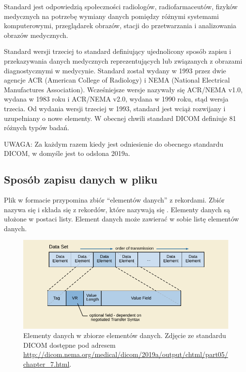 \label{sec:dicom}

\par
Standard \DICOM jest odpowiedzią społeczności radiologów, radiofarmaceutów, fizyków medycznych na potrzebę wymiany danych pomiędzy różnymi systemami komputerowymi, przeglądarek obrazów,  stacji do przetwarzania i analizowania obrazów medycznych.

\par
Standard \DICOM wersji trzeciej to standard definiujący ujednolicony sposób zapisu i przekazywania danych medycznych reprezentujących lub związanych z obrazami diagnostycznymi w medycynie.
Standard został wydany w 1993 przez dwie agencje ACR (American College of Radiology) i NEMA (National Electrical Manufactures Association).
Wcześniejsze wersje nazywały się ACR/NEMA v1.0, wydana w 1983 roku i ACR/NEMA v2.0, wydana w 1990 roku, stąd wersja trzecia.
Od wydania wersji trzeciej w 1993, standard jest wciąż rozwijany i uzupełniany o nowe elementy.
W obecnej chwili standard DICOM definiuje 81 różnych typów badań.

UWAGA: Za każdym razem kiedy jest odniesienie do obecnego standardu DICOM, w domyśle jest to odsłona 2019a.

\subsection{Sposób zapisu danych w pliku \DICOM}

\par
Plik w formacie \DICOM przypomina zbiór \enquote{elementów danych} z rekordami.
Zbiór nazywa się  i składa się z rekordów, które nazywają się .
Elementy danych są ułożone w postaci listy.
Element danych może zawierać w sobie listę elementów danych.

\begin{figure}[!htbp]
    \centering
    \includegraphics[]{img/dicom-dataelement001.pdf}
    \caption{Elementy danych w zbiorze elementów danych. Zdjęcie ze standardu DICOM dostępne pod adresem \url{http://dicom.nema.org/medical/dicom/2019a/output/chtml/part05/chapter_7.html}.}
    \label{fig:dicom-dataelement}
\end{figure}

